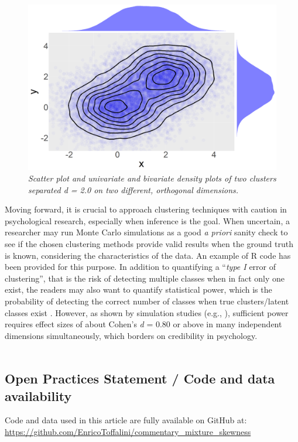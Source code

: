 \documentclass[letterpaper,11pt]{article}
\begin{document}
\begin{figure}[htbp]
	\label{fig:example}
	\caption{\newline \textit{Scatter plot and univariate and bivariate density plots of two clusters separated d = 2.0 on two different, orthogonal dimensions.}}
	\centering
	\includegraphics[width=\textwidth]{../R code simulations/biviariate-scatter-plot.png}
\end{figure}

Moving forward, it is crucial to approach clustering techniques with caution in psychological research, especially when inference is the goal. When uncertain, a researcher may run Monte Carlo simulations as a good \textit{a priori} sanity check to see if the chosen clustering methods provide valid results when the ground truth is known, considering the characteristics of the data. An example of R code has been provided for this purpose. In addition to quantifying a “\textit{type I} error of clustering”, that is the risk of detecting multiple classes when in fact only one exist, the readers may also want to quantify statistical power, which is the probability of detecting the correct number of classes when true clusters/latent classes exist \cite{tein2013statistical}.  However, as shown by simulation studies (e.g., ), sufficient power requires effect sizes of about Cohen’s \textit{d} = 0.80 or above in many independent dimensions simultaneously, which borders on credibility in psychology.
\\
\\
\subsection*{Open Practices Statement / Code and data availability }
Code and data used in this article are fully available on GitHub at: \url{https://github.com/EnricoToffalini/commentary_mixture_skewness}
\newpage


\end{document}
